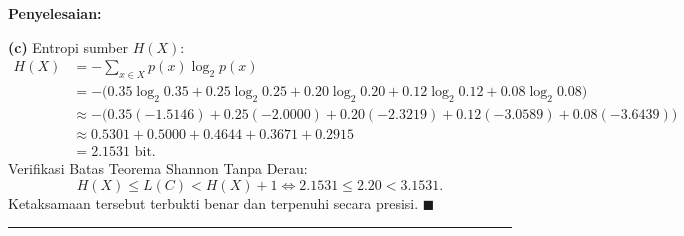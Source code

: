 \documentclass[11pt,a4paper]{article}
\newenvironment{solusi}{\noindent\textbf{\textsf{Penyelesaian:}}\par\vspace{0.2em}}{\hfill$\blacksquare$\vspace{1em}\par\hrule\vspace{1em}}
\begin{document}
\begin{solusi}
\textbf{(c)} Entropi sumber $H(X)$:
\begin{align*}
H(X) &= -\sum_{x \in X} p(x) \log_2 p(x) \\
&= -\big(0.35\log_2 0.35 + 0.25\log_2 0.25 + 0.20\log_2 0.20 + 0.12\log_2 0.12 + 0.08\log_2 0.08\big) \\
&\approx -\big(0.35(-1.5146) + 0.25(-2.0000) + 0.20(-2.3219) + 0.12(-3.0589) + 0.08(-3.6439)\big) \\
&\approx 0.5301 + 0.5000 + 0.4644 + 0.3671 + 0.2915 \\
&= 2.1531 \text{ bit}.
\end{align*}
Verifikasi Batas Teorema Shannon Tanpa Derau:
\[
H(X) \le L(C) < H(X) + 1 \iff 2.1531 \le 2.20 < 3.1531.
\]
Ketaksamaan tersebut terbukti benar dan terpenuhi secara presisi.
\end{solusi}
\end{document}
